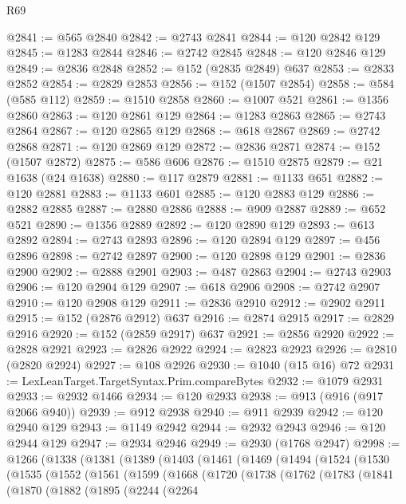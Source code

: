 \begin{lexlean}{R69}
\begin{coremodule}
@2841 := @565 @2840
@2842 := @2743 @2841
@2844 := @120 @2842 @129
@2845 := @1283 @2844
@2846 := @2742 @2845
@2848 := @120 @2846 @129
@2849 := @2836 @2848
@2852 := @152 (@2835 @2849) @637
@2853 := @2833 @2852
@2854 := @2829 @2853
@2856 := @152 (@1507 @2854)
@2858 := @584 (@585 @112)
@2859 := @1510 @2858
@2860 := @1007 @521
@2861 := @1356 @2860
@2863 := @120 @2861 @129
@2864 := @1283 @2863
@2865 := @2743 @2864
@2867 := @120 @2865 @129
@2868 := @618 @2867
@2869 := @2742 @2868
@2871 := @120 @2869 @129
@2872 := @2836 @2871
@2874 := @152 (@1507 @2872)
@2875 := @586 @606
@2876 := @1510 @2875
@2879 := @21 @1638 (@24 @1638)
@2880 := @117 @2879
@2881 := @1133 @651
@2882 := @120 @2881
@2883 := @1133 @601
@2885 := @120 @2883 @129
@2886 := @2882 @2885
@2887 := @2880 @2886
@2888 := @909 @2887
@2889 := @652 @521
@2890 := @1356 @2889
@2892 := @120 @2890 @129
@2893 := @613 @2892
@2894 := @2743 @2893
@2896 := @120 @2894 @129
@2897 := @456 @2896
@2898 := @2742 @2897
@2900 := @120 @2898 @129
@2901 := @2836 @2900
@2902 := @2888 @2901
@2903 := @487 @2863
@2904 := @2743 @2903
@2906 := @120 @2904 @129
@2907 := @618 @2906
@2908 := @2742 @2907
@2910 := @120 @2908 @129
@2911 := @2836 @2910
@2912 := @2902 @2911
@2915 := @152 (@2876 @2912) @637
@2916 := @2874 @2915
@2917 := @2829 @2916
@2920 := @152 (@2859 @2917) @637
@2921 := @2856 @2920
@2922 := @2828 @2921
@2923 := @2826 @2922
@2924 := @2823 @2923
@2926 := @2810 (@2820 @2924)
@2927 := @108 @2926
@2930 := @1040 (@15 @16) @72
@2931 := LexLeanTarget.TargetSyntax.Prim.compareBytes
@2932 := @1079 @2931
@2933 := @2932 @1466
@2934 := @120 @2933
@2938 := @913 (@916 (@917 @2066 @940))
@2939 := @912 @2938
@2940 := @911 @2939
@2942 := @120 @2940 @129
@2943 := @1149 @2942
@2944 := @2932 @2943
@2946 := @120 @2944 @129
@2947 := @2934 @2946
@2949 := @2930 (@1768 @2947)
@2998 := @1266
    (@1338
      (@1381
        (@1389
          (@1403
            (@1461
              (@1469
                (@1494
                  (@1524
                    (@1530
                      (@1535
                        (@1552
                          (@1561
                            (@1599
                              (@1668
                                (@1720
                                  (@1738
                                    (@1762
                                      (@1783
                                        (@1841
                                          (@1870
                                            (@1882
                                              (@1895
                                                (@2244
                                                  (@2264

\end{coremodule}
\end{lexlean}
